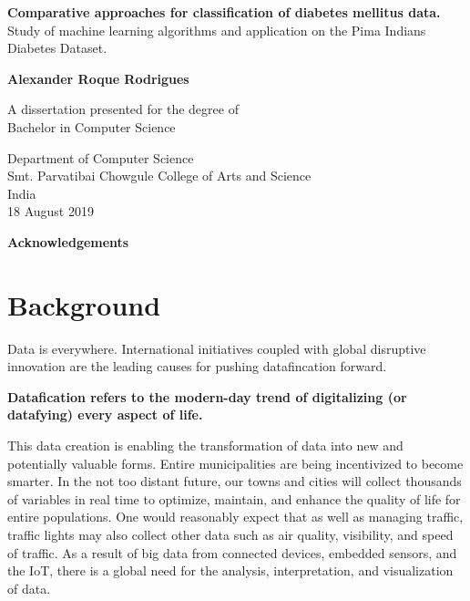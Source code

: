 \documentclass[12pt]{article}
\begin{document}
\begin{titlepage}
    \begin{center}
        \vspace*{1cm} 
        \Huge
        \textbf{Comparative approaches for classification of diabetes mellitus data.} 
        \vspace{0.5cm}
        \normalsize
        \vspace{0cm}
        \\
        Study of machine learning algorithms and application on the Pima Indians Diabetes Dataset.
 
        \vspace{1.5cm}
 
        \textbf{Alexander Roque Rodrigues}
 
        \vfill
 
        A dissertation presented for the degree of\\
        Bachelor in Computer Science
 
        \vspace{0.8cm}
  
        \Large
        Department of Computer Science\\        
        Smt. Parvatibai Chowgule College of Arts and Science\\
        India\\
        18 August 2019
 
    \end{center}
\end{titlepage}
\Huge
\newpage
\huge
\textbf{Acknowledgements}
\normalsize
\newpage
\tableofcontents
\newpage
\part{Background}
Data is everywhere. International initiatives coupled with global disruptive innovation are the leading causes for pushing datafincation forward.

\textbf{Datafication refers to the modern-day trend of digitalizing (or datafying) every aspect of life.}

This data creation is enabling the transformation of data into new and potentially valuable forms. Entire municipalities are being incentivized to become smarter. In the not too
distant future, our towns and cities will collect thousands of variables in
real time to optimize, maintain, and enhance the quality of life for entire
populations. One would reasonably expect that as well as managing traffic,
traffic lights may also collect other data such as air quality, visibility, and
speed of traffic. As a result of big data from connected devices, embedded
sensors, and the IoT, there is a global need for the analysis, interpretation,
and visualization of data.
\end{document}
